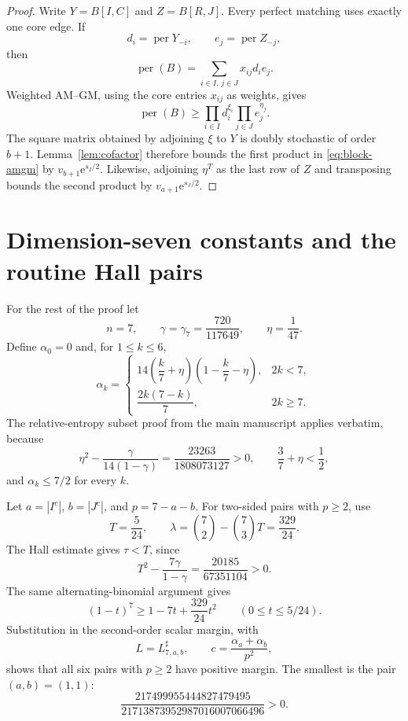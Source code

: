 \documentclass[11pt]{article}
\theoremstyle{definition}
\newcommand{\per}{\operatorname{per}}
\newcommand{\e}{\mathrm e}
\begin{document}
\begin{proof}
Write $Y=B[I,C]$ and $Z=B[R,J]$.  Every perfect matching uses exactly one core edge.  If
\[
 d_i=\per Y_{-i},
 \qquad e_j=\per Z_{-j},
\]
then
\[
 \per(B)=\sum_{i\in I,\,j\in J}x_{ij}d_i e_j.
\]
Weighted AM--GM, using the core entries $x_{ij}$ as weights, gives
\[
 \per(B)\ge
 \prod_{i\in I}d_i^{\xi_i}
 \prod_{j\in J}e_j^{\eta_j}.
 \tag{2.8}\label{eq:block-amgm}
\]
The square matrix obtained by adjoining $\xi$ to $Y$ is doubly stochastic of order $b+1$.  Lemma~\ref{lem:cofactor} therefore bounds the first product in \eqref{eq:block-amgm} by $v_{b+1}\e^{s_I/2}$.  Likewise, adjoining $\eta^T$ as the last row of $Z$ and transposing bounds the second product by $v_{a+1}\e^{s_J/2}$.
\end{proof}

\section{Dimension-seven constants and the routine Hall pairs}

For the rest of the proof let
\[
 n=7,
 \qquad \gamma=\gamma_7=\frac{720}{117649},
 \qquad \eta=\frac1{47}.
\]
Define $\alpha_0=0$ and, for $1\le k\le6$,
\[
 \alpha_k=
 \begin{cases}
 14\left(\dfrac{k}{7}+\eta\right)
       \left(1-\dfrac{k}{7}-\eta\right),&2k<7,\\[2mm]
 \dfrac{2k(7-k)}7,&2k\ge7.
 \end{cases}
 \tag{3.1}\label{eq:alpha7}
\]
The relative-entropy subset proof from the main manuscript applies verbatim, because
\[
 \eta^2-\frac{\gamma}{14(1-\gamma)}
 =\frac{23263}{1808073127}>0,
 \qquad
 \frac37+\eta<\frac12,
 \tag{3.2}\label{eq:localization7}
\]
and $\alpha_k\le7/2$ for every $k$.

Let $a=|I^c|$, $b=|J^c|$, and $p=7-a-b$.  For two-sided pairs with $p\ge2$, use
\[
 T=\frac5{24},
 \qquad \lambda=\binom72-\binom73T=\frac{329}{24}.
\]
The Hall estimate gives $\tau<T$, since
\[
 T^2-\frac{7\gamma}{1-\gamma}
 =\frac{20185}{67351104}>0.
\]
The same alternating-binomial argument gives
\[
 (1-t)^7\ge1-7t+\frac{329}{24}t^2
 \qquad(0\le t\le5/24).
\]
Substitution in the second-order scalar margin, with
\[
 L=L^{\sharp}_{7,a,b},
 \qquad c=\frac{\alpha_a+\alpha_b}{p^2},
\]
shows that all six pairs with $p\ge2$ have positive margin.  The smallest is the pair $(a,b)=(1,1)$:
\[
 \frac{217499955444827479495}
 {21713873952987016007066496}>0.
 \tag{3.3}\label{eq:pge2-min}
\]
\end{document}
